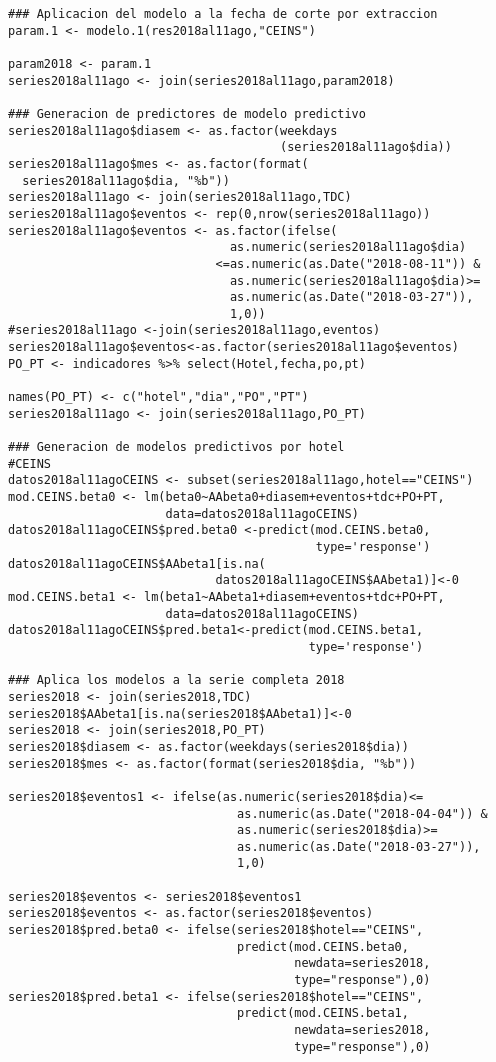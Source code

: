 \begin{verbatim}
### Aplicacion del modelo a la fecha de corte por extraccion
param.1 <- modelo.1(res2018al11ago,"CEINS")

param2018 <- param.1
series2018al11ago <- join(series2018al11ago,param2018)

### Generacion de predictores de modelo predictivo
series2018al11ago$diasem <- as.factor(weekdays
                                      (series2018al11ago$dia))
series2018al11ago$mes <- as.factor(format(
  series2018al11ago$dia, "%b"))
series2018al11ago <- join(series2018al11ago,TDC)
series2018al11ago$eventos <- rep(0,nrow(series2018al11ago))
series2018al11ago$eventos <- as.factor(ifelse(
                               as.numeric(series2018al11ago$dia)
                             <=as.numeric(as.Date("2018-08-11")) & 
                               as.numeric(series2018al11ago$dia)>=
                               as.numeric(as.Date("2018-03-27")),
                               1,0))
#series2018al11ago <-join(series2018al11ago,eventos)
series2018al11ago$eventos<-as.factor(series2018al11ago$eventos)
PO_PT <- indicadores %>% select(Hotel,fecha,po,pt)

names(PO_PT) <- c("hotel","dia","PO","PT")
series2018al11ago <- join(series2018al11ago,PO_PT)

### Generacion de modelos predictivos por hotel
#CEINS
datos2018al11agoCEINS <- subset(series2018al11ago,hotel=="CEINS")
mod.CEINS.beta0 <- lm(beta0~AAbeta0+diasem+eventos+tdc+PO+PT,
                      data=datos2018al11agoCEINS)
datos2018al11agoCEINS$pred.beta0 <-predict(mod.CEINS.beta0,
                                           type='response')
datos2018al11agoCEINS$AAbeta1[is.na(
                             datos2018al11agoCEINS$AAbeta1)]<-0
mod.CEINS.beta1 <- lm(beta1~AAbeta1+diasem+eventos+tdc+PO+PT,
                      data=datos2018al11agoCEINS)
datos2018al11agoCEINS$pred.beta1<-predict(mod.CEINS.beta1,
                                          type='response')

### Aplica los modelos a la serie completa 2018
series2018 <- join(series2018,TDC)
series2018$AAbeta1[is.na(series2018$AAbeta1)]<-0
series2018 <- join(series2018,PO_PT)
series2018$diasem <- as.factor(weekdays(series2018$dia))
series2018$mes <- as.factor(format(series2018$dia, "%b"))

series2018$eventos1 <- ifelse(as.numeric(series2018$dia)<=
                                as.numeric(as.Date("2018-04-04")) & 
                                as.numeric(series2018$dia)>=
                                as.numeric(as.Date("2018-03-27")),
                                1,0)

series2018$eventos <- series2018$eventos1
series2018$eventos <- as.factor(series2018$eventos)
series2018$pred.beta0 <- ifelse(series2018$hotel=="CEINS",
                                predict(mod.CEINS.beta0,
                                        newdata=series2018,
                                        type="response"),0)
series2018$pred.beta1 <- ifelse(series2018$hotel=="CEINS",
                                predict(mod.CEINS.beta1,
                                        newdata=series2018,
                                        type="response"),0)
\end{verbatim}
